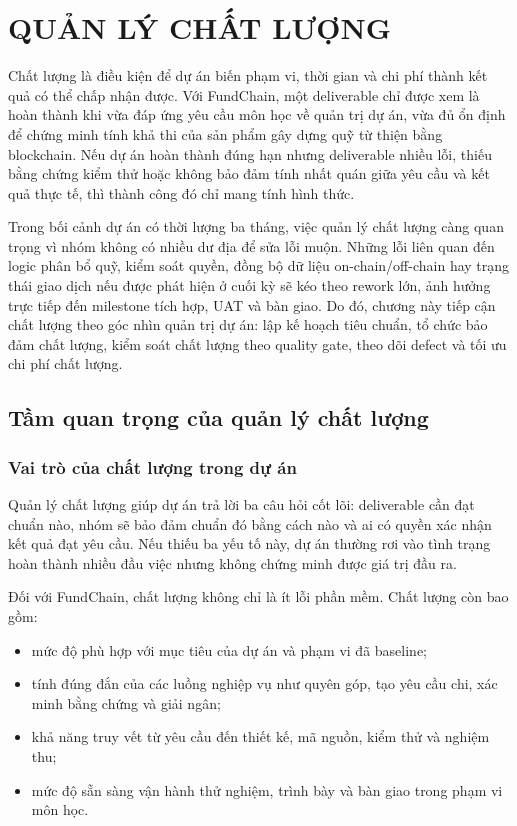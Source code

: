 \chapter{QUẢN LÝ CHẤT LƯỢNG}

Chất lượng là điều kiện để dự án biến phạm vi, thời gian và chi phí thành kết quả có thể chấp nhận được. Với FundChain, một deliverable chỉ được xem là hoàn thành khi vừa đáp ứng yêu cầu môn học về quản trị dự án, vừa đủ ổn định để chứng minh tính khả thi của sản phẩm gây dựng quỹ từ thiện bằng blockchain. Nếu dự án hoàn thành đúng hạn nhưng deliverable nhiều lỗi, thiếu bằng chứng kiểm thử hoặc không bảo đảm tính nhất quán giữa yêu cầu và kết quả thực tế, thì thành công đó chỉ mang tính hình thức.

Trong bối cảnh dự án có thời lượng ba tháng, việc quản lý chất lượng càng quan trọng vì nhóm không có nhiều dư địa để sửa lỗi muộn. Những lỗi liên quan đến logic phân bổ quỹ, kiểm soát quyền, đồng bộ dữ liệu on-chain/off-chain hay trạng thái giao dịch nếu được phát hiện ở cuối kỳ sẽ kéo theo rework lớn, ảnh hưởng trực tiếp đến milestone tích hợp, UAT và bàn giao. Do đó, chương này tiếp cận chất lượng theo góc nhìn quản trị dự án: lập kế hoạch tiêu chuẩn, tổ chức bảo đảm chất lượng, kiểm soát chất lượng theo quality gate, theo dõi defect và tối ưu chi phí chất lượng.

\iffalse
\section{Tầm quan trọng của quản lý chất lượng}

\subsection{Vai trò của chất lượng trong dự án}

Quản lý chất lượng giúp dự án trả lời ba câu hỏi cốt lõi: deliverable cần đạt chuẩn nào, nhóm sẽ bảo đảm chuẩn đó bằng cách nào và ai có quyền xác nhận kết quả đạt yêu cầu. Nếu thiếu ba yếu tố này, dự án thường rơi vào tình trạng hoàn thành nhiều đầu việc nhưng không chứng minh được giá trị đầu ra.

Đối với FundChain, chất lượng không chỉ là ít lỗi phần mềm. Chất lượng còn bao gồm:

\begin{itemize}
  \item mức độ phù hợp với mục tiêu của dự án và phạm vi đã baseline;
  \item tính đúng đắn của các luồng nghiệp vụ như quyên góp, tạo yêu cầu chi, xác minh bằng chứng và giải ngân;
  \item khả năng truy vết từ yêu cầu đến thiết kế, mã nguồn, kiểm thử và nghiệm thu;
  \item mức độ sẵn sàng vận hành thử nghiệm, trình bày và bàn giao trong phạm vi môn học.
\end{itemize}

